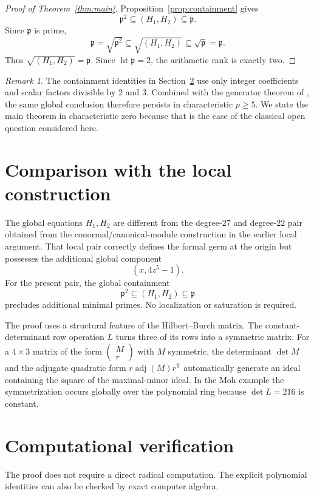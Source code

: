 \documentclass[11pt]{amsart}
\theoremstyle{remark}
\newtheorem{remark}[theorem]{Remark}
\DeclareMathOperator{\adj}{adj}
\begin{document}
\begin{proof}[Proof of Theorem~\ref{thm:main}]
Proposition~\ref{prop:containment} gives
\[
 \mathfrak p^2\subseteq(H_1,H_2)\subseteq\mathfrak p.
\]
Since $\mathfrak p$ is prime,
\[
 \mathfrak p=\sqrt{\mathfrak p^2}
 \subseteq\sqrt{(H_1,H_2)}
 \subseteq\sqrt{\mathfrak p}=\mathfrak p.
\]
Thus $\sqrt{(H_1,H_2)}=\mathfrak p$.  Since $\operatorname{ht}\mathfrak p=2$, the arithmetic rank is exactly two.
\end{proof}

\begin{remark}\label{rem:charp}
The containment identities in Section~\ref{sec:verification} use only integer coefficients and scalar factors divisible by $2$ and $3$.  Combined with the generator theorem of \cite{GonzalezPlanas2026}, the same global conclusion therefore persists in characteristic $p\ge5$.  We state the main theorem in characteristic zero because that is the case of the classical open question considered here.
\end{remark}

\section{Comparison with the local construction}
The global equations $H_1,H_2$ are different from the degree-$27$ and degree-$22$ pair obtained from the conormal/canonical-module construction in the earlier local argument.  That local pair correctly defines the formal germ at the origin but possesses the additional global component
\[
 (x,4z^5-1).
\]
For the present pair, the global containment
\[
 \mathfrak p^2\subseteq(H_1,H_2)\subseteq\mathfrak p
\]
precludes additional minimal primes.  No localization or saturation is required.

The proof uses a structural feature of the Hilbert--Burch matrix.  The constant-determinant row operation $L$ turns three of its rows into a symmetric matrix.  For a $4\times3$ matrix of the form $\left(\begin{smallmatrix}M\\r\end{smallmatrix}\right)$ with $M$ symmetric, the determinant $\det M$ and the adjugate quadratic form $r\adj(M)r^{\mathsf T}$ automatically generate an ideal containing the square of the maximal-minor ideal.  In the Moh example the symmetrization occurs globally over the polynomial ring because $\det L=216$ is constant.

\section{Computational verification}\label{sec:verification}
The proof does not require a direct radical computation.  The explicit polynomial identities can also be checked by exact computer algebra.
\end{document}
